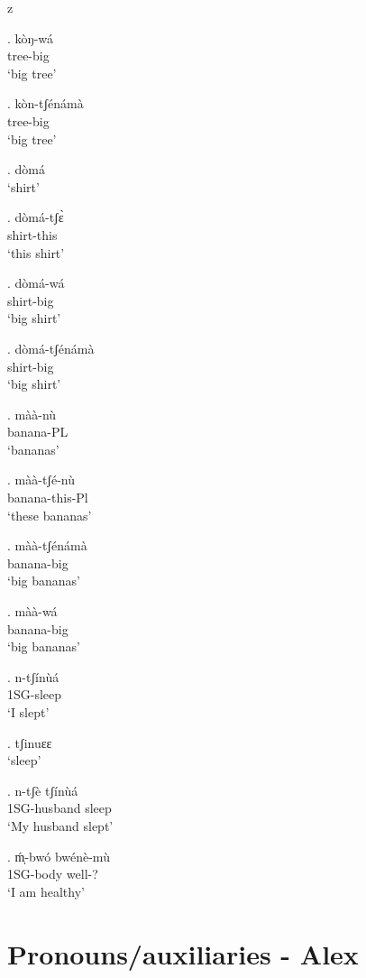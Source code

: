 z   \documentclass{assets/fieldnotes}
\begin{document}
 \exg. kòŋ-wá\\
tree-big\\
`big tree'

\exg. kòn-tʃénámà\\
tree-big\\
`big tree'



\ex. dòmá\\
`shirt'

\exg. dòmá-tʃɛ̀\\
shirt-this\\
`this shirt'


\exg. dòmá-wá\\
shirt-big\\
`big shirt'

\exg. dòmá-tʃénámà\\
shirt-big\\
`big shirt'


\exg. màà-nù\\
banana-PL\\
`bananas'

\exg. màà-tʃé-nù\\
banana-this-Pl\\
`these bananas'

\exg. màà-tʃénámà\\
banana-big\\
`big bananas'

\exg. màà-wá\\
banana-big\\
`big bananas'


\exg. n-tʃínùá\\
1SG-sleep\\
`I slept'

\ex. tʃinuɛɛ\\
`sleep'

\exg. n-tʃè tʃínùá\\
1SG-husband sleep\\
`My husband slept'

\ex. ḿ̩-bwó bwénè-mù\\
1SG-body well-?\\
`I am healthy'

\section{Pronouns/auxiliaries - Alex}
\end{document}

